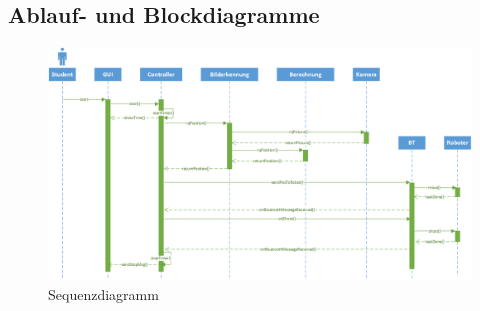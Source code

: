 \subsection{Ablauf- und Blockdiagramme}
\begin{figure}[h!]          
	\centering             
	\includegraphics[width=1.15\textwidth, angle=90]{fig/Sequenzdiagramm.png}
	\caption{Sequenzdiagramm}
	\label{fig:Sequenzdiagramm}        
\end{figure}
